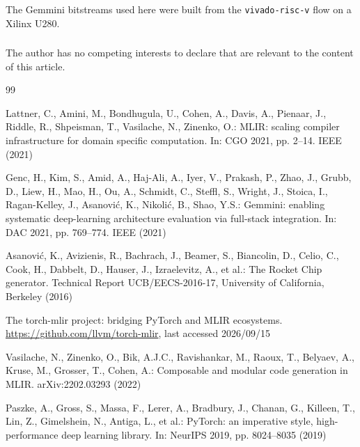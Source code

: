 \documentclass[runningheads]{llncs}
\begin{document}
\begin{credits}
\subsubsection{\ackname} The Gemmini bitstreams used here were built from the
\texttt{vivado-risc-v} flow on a Xilinx U280.

\subsubsection{\discintname}
The author has no competing interests to declare that are relevant to the content
of this article.
\end{credits}
%
%
\begin{thebibliography}{99}

Lattner, C., Amini, M., Bondhugula, U., Cohen, A., Davis, A., Pienaar, J.,
Riddle, R., Shpeisman, T., Vasilache, N., Zinenko, O.: MLIR: scaling compiler
infrastructure for domain specific computation. In: CGO 2021, pp. 2--14. IEEE
(2021)

Genc, H., Kim, S., Amid, A., Haj-Ali, A., Iyer, V., Prakash, P., Zhao, J.,
Grubb, D., Liew, H., Mao, H., Ou, A., Schmidt, C., Steffl, S., Wright, J.,
Stoica, I., Ragan-Kelley, J., Asanovi\'c, K., Nikoli\'c, B., Shao, Y.S.:
Gemmini: enabling systematic deep-learning architecture evaluation via
full-stack integration. In: DAC 2021, pp. 769--774. IEEE (2021)

Asanovi\'c, K., Avizienis, R., Bachrach, J., Beamer, S., Biancolin, D., Celio,
C., Cook, H., Dabbelt, D., Hauser, J., Izraelevitz, A., et al.: The Rocket Chip
generator. Technical Report UCB/EECS-2016-17, University of California, Berkeley
(2016)

The torch-mlir project: bridging PyTorch and MLIR ecosystems.
\url{https://github.com/llvm/torch-mlir}, last accessed 2026/09/15

Vasilache, N., Zinenko, O., Bik, A.J.C., Ravishankar, M., Raoux, T., Belyaev,
A., Kruse, M., Grosser, T., Cohen, A.: Composable and modular code generation in
MLIR. arXiv:2202.03293 (2022)

Paszke, A., Gross, S., Massa, F., Lerer, A., Bradbury, J., Chanan, G., Killeen,
T., Lin, Z., Gimelshein, N., Antiga, L., et al.: PyTorch: an imperative style,
high-performance deep learning library. In: NeurIPS 2019, pp. 8024--8035 (2019)


\end{thebibliography}
\end{document}

